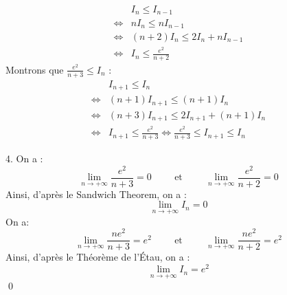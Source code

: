 \documentclass[10pt]{article}
\begin{document}
\begin{tcolorbox}[enhanced, width=7in, center, size=fbox, fontupper=\large, drop shadow southwest]
    \begin{align*}
        &I_n \leq I_{n-1}\\
        \iff&nI_n \leq nI_{n-1}\\
        \iff&(n+2)I_n \leq 2I_n + nI_{n-1}\\
        \iff&I_n \leq \frac{e^2}{n+2}
    \end{align*}
    Montrons que $\frac{e^2}{n+3} \leq I_n$ :
    \begin{align*}
        &I_{n+1} \leq I_n\\
        \iff&(n+1)I_{n+1} \leq (n+1)I_n\\
        \iff&(n+3)I_{n+1} \leq 2I_{n+1} + (n+1)I_n\\
        \iff&I_{n+1} \leq \frac{e^2}{n+3} \iff \frac{e^2}{n+3} \leq I_{n+1} \leq I_n
    \end{align*}
\end{tcolorbox}

\begin{tcolorbox}[enhanced, width=7in, center, size=fbox, fontupper=\large, drop shadow southwest]
    4. On a :
    \begin{equation*}
        \lim\limits_{n\to+\infty}{\frac{e^2}{n+3}}=0 \hspace{1cm} \text{et} \hspace{1cm} \lim\limits_{n\to+\infty}{\frac{e^2}{n+2}}=0
    \end{equation*} 
    Ainsi, d'après le Sandwich Theorem, on a :
    \begin{equation*}
        \lim\limits_{n\to+\infty}{I_n}=0
    \end{equation*}
    On a: 
    \begin{equation*}
        \lim\limits_{n\to+\infty}{\frac{ne^2}{n+3}}=e^2 \hspace{1cm} \text{et} \hspace{1cm} \lim\limits_{n\to+\infty}{\frac{ne^2}{n+2}}=e^2
    \end{equation*} 
    Ainsi, d'après le Théorème de l'Étau, on a :
    \begin{equation*}
        \lim\limits_{n\to+\infty}{I_n}=e^2
    \end{equation*}
    \qed
\end{tcolorbox}
\end{document}

